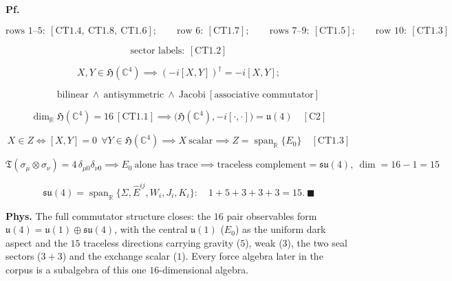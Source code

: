 \begin{theorem}
\textbf{Pf.}

\[
\text{rows }1\text{–}5:\ [\mathrm{CT1.4},\ \mathrm{CT1.8},\ \mathrm{CT1.6}];\qquad
\text{row }6:\ [\mathrm{CT1.7}];\qquad
\text{rows }7\text{–}9:\ [\mathrm{CT1.5}];\qquad
\text{row }10:\ [\mathrm{CT1.3}]
\]

\[
\text{sector labels}:\ [\mathrm{CT1.2}]
\]

\[
X,Y\in\mathfrak H(\mathbb C^4)\implies(-i[X,Y])^\dagger=-i[X,Y];
\]

\[
\qquad \text{bilinear}\ \wedge\ \text{antisymmetric}\ \wedge\ \text{Jacobi}\ [\text{associative commutator}]
\]

\[
\dim_{\mathbb R}\mathfrak H(\mathbb C^4)=16\ [\mathrm{CT1.1}]\implies\bigl(\mathfrak H(\mathbb C^4),-i[\cdot,\cdot]\bigr)=\mathfrak u(4)\quad[\mathrm{C2}]
\]

\[
X\in Z\iff[X,Y]=0\ \ \forall Y\in\mathfrak H(\mathbb C^4)\implies X\ \text{scalar}\implies Z=\operatorname{span}_{\mathbb R}\{E_0\}\quad[\mathrm{CT1.3}]
\]

\[
\mathfrak T(\sigma_\mu\otimes\sigma_\nu)=4\,\delta_{\mu0}\delta_{\nu0}\implies E_0\ \text{alone has trace}\implies\text{traceless complement}=\mathfrak{su}(4),\ \dim=16-1=15
\]

\[
\mathfrak{su}(4)=\operatorname{span}_{\mathbb R}\{\Sigma,\hat E^{ij},W_i,J_i,K_i\}:\quad1+5+3+3+3=15.\ \blacksquare
\]

\textbf{Phys.} The full commutator structure closes: the $16$ pair observables form $\mathfrak u(4)=\mathfrak u(1)\oplus\mathfrak{su}(4)$, with the central $\mathfrak u(1)$ ($E_0$) as the uniform dark aspect and the $15$ traceless directions carrying gravity ($5$), weak ($3$), the two seal sectors ($3{+}3$) and the exchange scalar ($1$). Every force algebra later in the corpus is a subalgebra of this one $16$-dimensional algebra.

\end{theorem}

